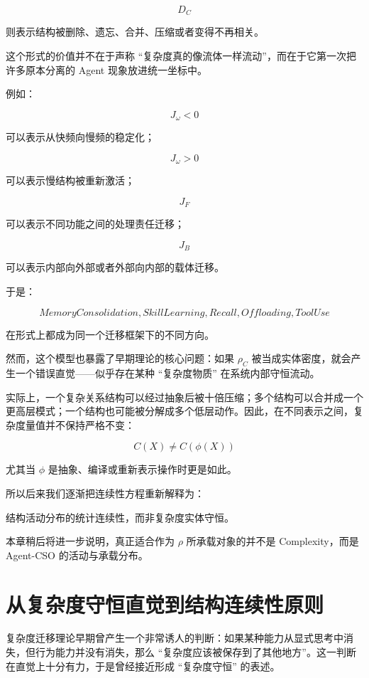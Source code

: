 \[
D_C
\]

则表示结构被删除、遗忘、合并、压缩或者变得不再相关。

这个形式的价值并不在于声称 ``复杂度真的像流体一样流动''，而在于它第一次把许多原本分离的 Agent 现象放进统一坐标中。

例如：

\[
J_\omega<0
\]

可以表示从快频向慢频的稳定化；

\[
J_\omega>0
\]

可以表示慢结构被重新激活；

\[
J_F
\]

可以表示不同功能之间的处理责任迁移；

\[
J_B
\]

可以表示内部向外部或者外部向内部的载体迁移。

于是：

\[
MemoryConsolidation,
SkillLearning,
Recall,
Offloading,
ToolUse
\]

在形式上都成为同一个迁移框架下的不同方向。

然而，这个模型也暴露了早期理论的核心问题：如果 $\rho_C$ 被当成实体密度，就会产生一个错误直觉——似乎存在某种 ``复杂度物质'' 在系统内部守恒流动。

实际上，一个复杂关系结构可以经过抽象后被十倍压缩；多个结构可以合并成一个更高层模式；一个结构也可能被分解成多个低层动作。因此，在不同表示之间，复杂度量值并不保持严格不变：

\[
C(X)
\neq
C(\phi(X))
\]

尤其当 $\phi$ 是抽象、编译或重新表示操作时更是如此。

所以后来我们逐渐把连续性方程重新解释为：

\begin{statementbox}
结构活动分布的统计连续性，而非复杂度实体守恒。
\end{statementbox}

本章稍后将进一步说明，真正适合作为 $\rho$ 所承载对象的并不是 Complexity，而是 Agent-CSO 的活动与承载分布。

\section{从复杂度守恒直觉到结构连续性原则}
\label{sec:structural-continuity}

复杂度迁移理论早期曾产生一个非常诱人的判断：如果某种能力从显式思考中消失，但行为能力并没有消失，那么 ``复杂度应该被保存到了其他地方''。这一判断在直觉上十分有力，于是曾经接近形成 ``复杂度守恒'' 的表述。


